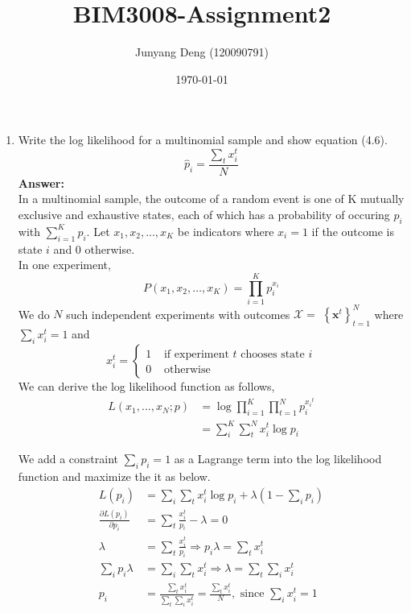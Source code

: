 \documentclass{article}
\title{BIM3008-Assignment2}
\author{Junyang Deng (120090791)}
\date{\today}
\begin{document}
 
\maketitle

\begin{enumerate}
    \item Write the log likelihood for a multinomial sample and show equation (4.6). %
    $$
    \hat{p}_i=\frac{\sum_t x_i^t}{N}
    $$
    \textbf{Answer:} \\
    In a multinomial sample, the outcome of a random event is one of K mutually exclusive and exhaustive states, each of which has a probability of occuring $p_i$ with $\sum^K_{i=1}p_i$. Let $x_1, x_2,...,x_K$ be indicators where $x_i=1$ if the outcome is state $i$ and 0 otherwise.\\
    In one experiment, 
    $$
    P\left(x_1, x_2, \ldots, x_K\right)=\prod_{i=1}^K p_i^{x_i}
    $$
    We do $N$ such independent experiments with outcomes $\mathcal{X}=$ $\left\{\boldsymbol{x}^t\right\}_{t=1}^N$ where $\sum_i x_i^t=1$ and
    $$
    x_i^t= \begin{cases}1 & \text { if experiment } t \text { chooses state } i \\ 0 & \text { otherwise }\end{cases}$$
    We can derive the log likelihood function as follows,
    $$
    \begin{aligned}
    L(x_1, ..., x_N; p)&=\log \prod_{i=1}^K \prod_{t=1}^N p_i^{{x_i}^t}\\
    &=\sum_i^K \sum_t^N x_i^t \log p_i
    \end{aligned}
    $$

    We add a constraint $\sum_i p_i=1$ as a Lagrange term into the log likelihood function and maximize the it as below.
    $$
    \begin{aligned}
    L\left(p_i\right) &=\sum_i \sum_t x_i^t \log p_i+\lambda\left(1-\sum_i p_i\right) \\
    \frac{\partial L(p_i)}{\partial p_i} &=\sum_t\frac{x_i^t}{p_i}-\lambda=0 \\
    \lambda &=\sum_t\frac{x_i^t}{p_i} \Rightarrow p_i \lambda=\sum_t x_i^t \\
    \sum_i p_i \lambda &=\sum_i \sum_t x_i^t \Rightarrow \lambda=\sum_t \sum_i x_i^t \\
    p_i &=\frac{\sum_t x_i^t}{\sum_t \sum_i x_i^t}=\frac{\sum_t x_i^t}{N}, \text{ since } \sum_i x_i^t=1
    \end{aligned}
    $$



\end{enumerate}
\end{document}

